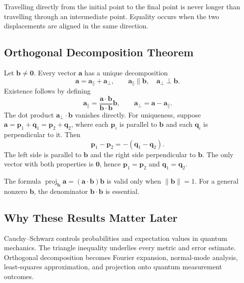 \begin{physicalbox}
Travelling directly from the initial point to the final point is never longer
than travelling through an intermediate point. Equality occurs when the two
displacements are aligned in the same direction.
\end{physicalbox}

\subsection{Orthogonal Decomposition Theorem}
Let $\mathbf b\neq\mathbf0$. Every vector $\mathbf a$ has a unique decomposition
\[
\boxed{\mathbf a=\mathbf a_{\parallel}+\mathbf a_{\perp}},
\qquad
\mathbf a_{\parallel}\parallel\mathbf b,
\quad
\mathbf a_{\perp}\perp\mathbf b.
\]
Existence follows by defining
\[
\mathbf a_{\parallel}=\frac{\mathbf a\cdot\mathbf b}{\mathbf b\cdot\mathbf b}\mathbf b,
\qquad
\mathbf a_{\perp}=\mathbf a-\mathbf a_{\parallel}.
\]
The dot product $\mathbf a_{\perp}\cdot\mathbf b$ vanishes directly. For
uniqueness, suppose
$\mathbf a=\mathbf p_1+\mathbf q_1=\mathbf p_2+\mathbf q_2$, where each
$\mathbf p_i$ is parallel to $\mathbf b$ and each $\mathbf q_i$ is perpendicular
to it. Then
\[
\mathbf p_1-\mathbf p_2=-(\mathbf q_1-\mathbf q_2).
\]
The left side is parallel to $\mathbf b$ and the right side perpendicular to
$\mathbf b$. The only vector with both properties is $\mathbf0$, hence
$\mathbf p_1=\mathbf p_2$ and $\mathbf q_1=\mathbf q_2$.

\begin{mistakebox}
The formula $\operatorname{proj}_{\mathbf b}\mathbf a=(\mathbf a\cdot\mathbf b)\mathbf b$
is valid only when $\lVert\mathbf b\rVert=1$. For a general nonzero $\mathbf b$,
the denominator $\mathbf b\cdot\mathbf b$ is essential.
\end{mistakebox}

\subsection{Why These Results Matter Later}
Cauchy--Schwarz controls probabilities and expectation values in quantum
mechanics. The triangle inequality underlies every metric and error estimate.
Orthogonal decomposition becomes Fourier expansion, normal-mode analysis,
least-squares approximation, and projection onto quantum measurement outcomes.
